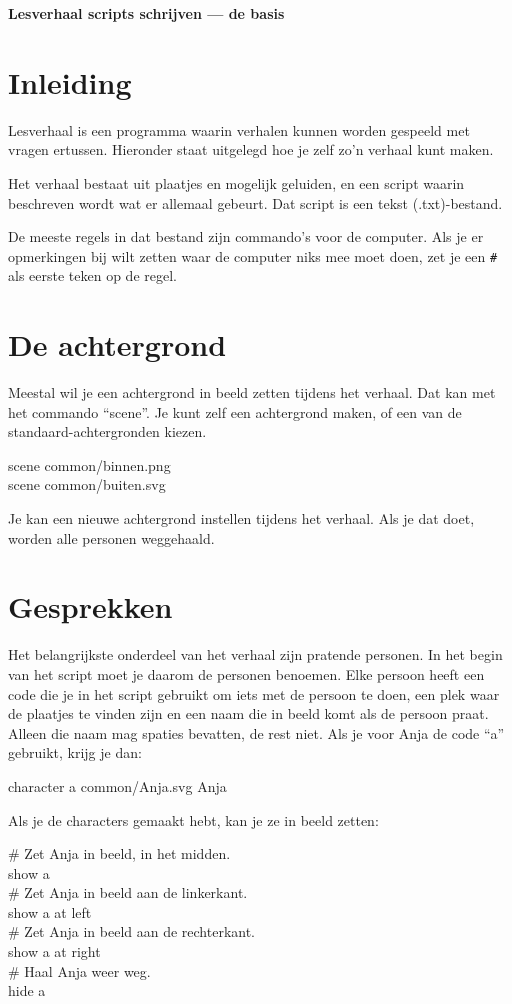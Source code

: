 \documentclass{article}
\newcommand\code[1]{\par\noindent\begin{texttt}#1\end{texttt}\par}
\begin{document}
\noindent\textbf{\Large Lesverhaal scripts schrijven --- de basis}

\tableofcontents

\section{Inleiding}
Lesverhaal is een programma waarin verhalen kunnen worden gespeeld met vragen
ertussen. Hieronder staat uitgelegd hoe je zelf zo'n verhaal kunt maken.

Het verhaal bestaat uit plaatjes en mogelijk geluiden, en een script waarin
beschreven wordt wat er allemaal gebeurt. Dat script is een tekst
(.txt)-bestand.

De meeste regels in dat bestand zijn commando's voor de computer. Als je er
opmerkingen bij wilt zetten waar de computer niks mee moet doen, zet je een
\verb-#- als eerste teken op de regel.

\section{De achtergrond}
Meestal wil je een achtergrond in beeld zetten tijdens het verhaal. Dat kan met
het commando ``scene''. Je kunt zelf een achtergrond maken, of een van de
standaard-achtergronden kiezen.
\code{scene common/binnen.png\\
scene common/buiten.svg}

Je kan een nieuwe achtergrond instellen tijdens het verhaal. Als je dat doet,
worden alle personen weggehaald.

\section{Gesprekken}
Het belangrijkste onderdeel van het verhaal zijn pratende personen. In het
begin van het script moet je daarom de personen benoemen. Elke persoon heeft
een code die je in het script gebruikt om iets met de persoon te doen, een plek
waar de plaatjes te vinden zijn en een naam die in beeld komt als de persoon
praat. Alleen die naam mag spaties bevatten, de rest niet. Als je voor Anja de
code ``a'' gebruikt, krijg je dan:
\code{character a common/Anja.svg Anja}

\noindent Als je de characters gemaakt hebt, kan je ze in beeld zetten:
\code{\# Zet Anja in beeld, in het midden.\\
show a\\
\# Zet Anja in beeld aan de linkerkant.\\
show a at left\\
\# Zet Anja in beeld aan de rechterkant.\\
show a at right\\
\# Haal Anja weer weg.\\
hide a}
\end{document}
